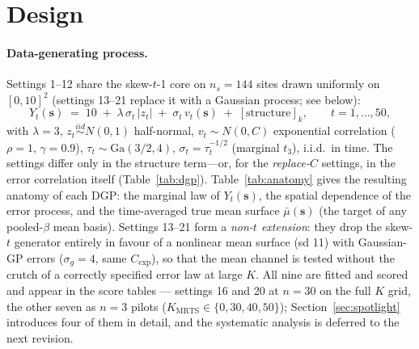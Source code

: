 \documentclass[11pt]{article}
\newcommand{\bs}{\boldsymbol{s}}
\newcommand{\Kmrts}{K_{\mathrm{MRTS}}}
\begin{document}
\section{Design}

\paragraph{Data-generating process.}
Settings 1--12 share the skew-$t$-1 core on $n_s=144$ sites drawn uniformly on
$[0,10]^2$ (settings 13--21 replace it with a Gaussian process; see below):
\begin{equation}
Y_t(\bs) \;=\; 10 \;+\; \lambda\,\sigma_t\,|z_t| \;+\; \sigma_t\, v_t(\bs)
\;+\; [\text{structure}]_k,
\qquad t = 1,\dots,50,
\label{eq:core}
\end{equation}
with $\lambda = 3$, $z_t \stackrel{iid}{\sim} N(0,1)$ half-normal,
$v_t \sim N(0, C)$ exponential correlation ($\rho=1$, $\gamma=0.9$),
$\tau_t \sim \mathrm{Ga}(3/2, 4)$, $\sigma_t = \tau_t^{-1/2}$ (marginal $t_3$),
i.i.d.\ in time. The settings differ only in the structure term---or, for the
\emph{replace-$C$} settings, in the error correlation itself
(Table~\ref{tab:dgp}). Table~\ref{tab:anatomy} gives the resulting anatomy of
each DGP: the marginal law of $Y_t(\bs)$, the spatial dependence of the error
process, and the time-averaged true mean surface $\bar\mu(\bs)$ (the target of
any pooled-$\beta$ mean basis). Settings 13--21 form a \emph{non-$t$ extension}:
they drop the skew-$t$ generator entirely in favour of a nonlinear mean surface
(sd 11) with Gaussian-GP errors ($\sigma_g = 4$, same $C_{\mathrm{exp}}$), so
that the mean channel is tested without the crutch of a correctly specified
error law at large $K$. All nine are fitted and scored and appear in the score
tables --- settings 16 and 20 at $n = 30$ on the full $K$ grid, the other seven
as $n = 3$ pilots ($\Kmrts \in \{0, 30, 40, 50\}$);
Section~\ref{sec:spotlight} introduces four of them in detail, and the
systematic analysis is deferred to the next revision.
\end{document}
